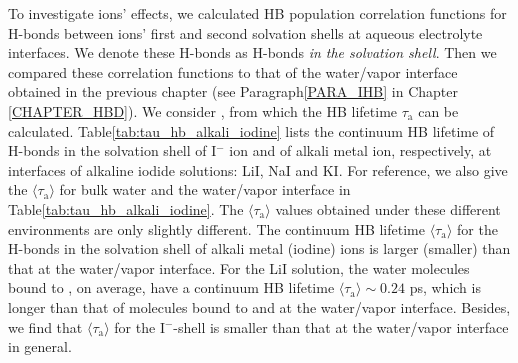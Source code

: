 To investigate ions' effects, we calculated HB population correlation functions for H-bonds between 
ions' first and second solvation shells at aqueous electrolyte interfaces.
We denote these H-bonds as H-bonds \emph{in the solvation shell}.
Then we compared these correlation functions to that of the water/vapor interface obtained in the previous chapter 
(see Paragraph\thinspace\ref{PARA_IHB} in Chapter \ref{CHAPTER_HBD}). 
We consider \SHB, from which the HB lifetime $\tau_\text{a}$ can be calculated.
Table\thinspace\ref{tab:tau_hb_alkali_iodine} lists the continuum HB lifetime of H-bonds in the solvation shell 
of I$^-$ ion and of alkali metal ion, respectively, at interfaces of alkaline iodide solutions: LiI, NaI and KI. 
For reference, we also give the $\langle\tau_\text{a}\rangle$ for bulk water and the water/vapor interface in Table\thinspace\ref{tab:tau_hb_alkali_iodine}.
The $\langle\tau_\text{a}\rangle$ values obtained under these different environments are only slightly different.
The continuum HB lifetime $\langle\tau_{\text{a}}\rangle$ for the H-bonds in the 
solvation shell of alkali metal (iodine) ions is larger (smaller) than 
that at the water/vapor interface. 
For the LiI solution, the water molecules bound to \Li, on average, have a continuum HB lifetime $\langle\tau_{\text{a}}\rangle \sim 0.24$ ps,
which is longer than that of molecules bound to \I and at the water/vapor interface. 
Besides, we find that $\langle\tau_{\text{a}}\rangle$ for the I$^-$-shell is smaller than that at the water/vapor interface in general.



\FloatBarrier
